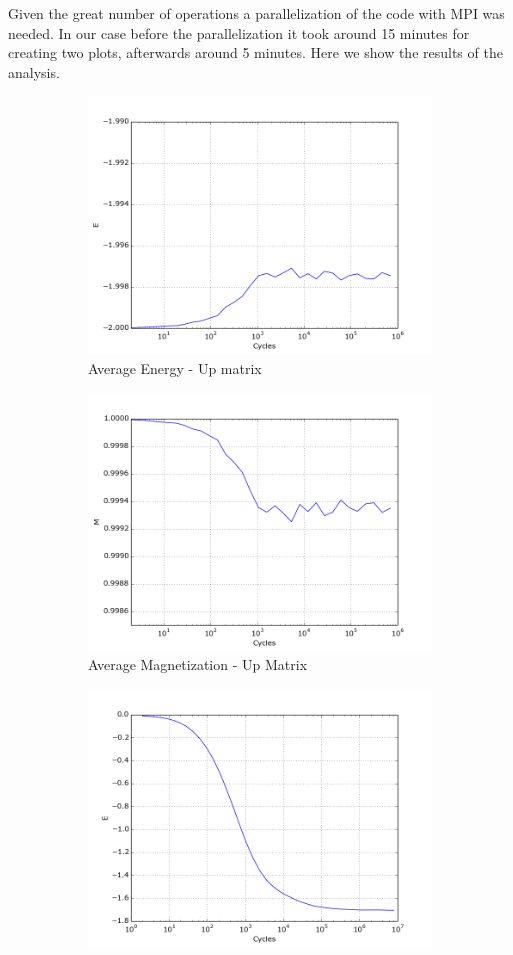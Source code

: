 \documentclass[10pt,a4paper,titlepage]{article}
\begin{document}
\noindent Given the great number of operations a parallelization of the code with MPI was needed. In our case before the parallelization  it took around 15 minutes for creating two plots, afterwards around 5 minutes.
Here we show the results of the analysis.
\begin{figure}[H]
\begin{subfigure}{.5\textwidth}
  \centering
  \includegraphics[width=.8\linewidth]{ENERGY_T1_UP_10000MEAN}
  \caption{{\footnotesize Average Energy - Up matrix}}
  \label{fig:sfig1}
\end{subfigure}%
\begin{subfigure}{.5\textwidth}
  \centering
  \includegraphics[width=.8\linewidth]{MAGNETIZATION_T1_UP_10000MEAN}
  \caption{{\footnotesize Average Magnetization - Up Matrix}}
  \label{fig:sfig2}
\end{subfigure}
\begin{subfigure}{.5\textwidth}
  \centering
  \includegraphics[width=.8\linewidth]{ENERGY_T1_RAND_1000MEAN}

\end{subfigure}
\end{figure}
\end{document}
